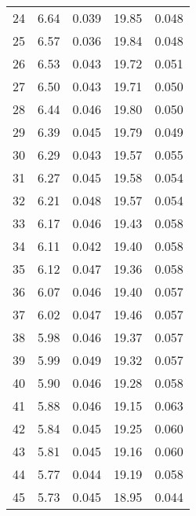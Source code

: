 \begin{table}
\begin{tabular}{c|ll|ll}
24 & 6.64 & 0.039 & 19.85 & 0.048 \\
25 & 6.57 & 0.036 & 19.84 & 0.048 \\
26 & 6.53 & 0.043 & 19.72 & 0.051 \\
27 & 6.50 & 0.043 & 19.71 & 0.050 \\
28 & 6.44 & 0.046 & 19.80 & 0.050 \\
29 & 6.39 & 0.045 & 19.79 & 0.049 \\
30 & 6.29 & 0.043 & 19.57 & 0.055 \\
31 & 6.27 & 0.045 & 19.58 & 0.054 \\
32 & 6.21 & 0.048 & 19.57 & 0.054 \\
33 & 6.17 & 0.046 & 19.43 & 0.058 \\
34 & 6.11 & 0.042 & 19.40 & 0.058 \\
35 & 6.12 & 0.047 & 19.36 & 0.058 \\
36 & 6.07 & 0.046 & 19.40 & 0.057 \\
37 & 6.02 & 0.047 & 19.46 & 0.057 \\
38 & 5.98 & 0.046 & 19.37 & 0.057 \\
39 & 5.99 & 0.049 & 19.32 & 0.057 \\
40 & 5.90 & 0.046 & 19.28 & 0.058 \\
41 & 5.88 & 0.046 & 19.15 & 0.063 \\
42 & 5.84 & 0.045 & 19.25 & 0.060 \\
43 & 5.81 & 0.045 & 19.16 & 0.060 \\
44 & 5.77 & 0.044 & 19.19 & 0.058 \\
45 & 5.73 & 0.045 & 18.95 & 0.044 \\
               \hline
        \end{tabular}
    \end{table}
    \clearpage

